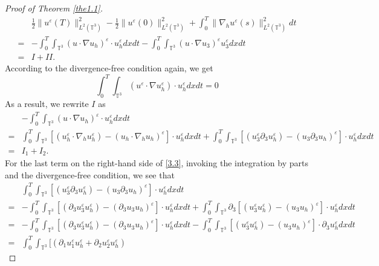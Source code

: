 \documentclass[11pt]{article}
\theoremstyle{plain}\newtheorem{definition}{Definition}[section]
\theoremstyle{definition}\newtheorem{theorem}{Theorem}[section]
\theoremstyle{plain}\newtheorem{lemma}[theorem]{Lemma}
\theoremstyle{plain}\newtheorem{coro}[theorem]{Corollary}
\theoremstyle{plain}\newtheorem{prop}[theorem]{Proposition}
\theoremstyle{remark}\newtheorem{remark}{Remark}[section]
\newcommand{\be}{\begin{equation}}
\newcommand{\ee}{\end{equation}}
\newcommand{\ba}{\begin{aligned}}
\newcommand{\ea}{\end{aligned}}
\newcommand{\f}{\frac}
\numberwithin{equation}{section}
\begin{document}
\begin{proof}[Proof of Theorem \ref{the1.1}]
\begin{equation}\ba\label{3.2}
&\f12\|u ^{\varepsilon}(T)\|^{2}_{L^{2}(\mathbb{T}^3)}
-\f12\|{u }^{\varepsilon}(0) \|^{2}_{L^{2}(\mathbb{T}^3)} +\int_{0}^{T}\|\nabla_{h}{u }^{\varepsilon}(s) \|^{2}_{L^{2}(\mathbb{T}^3)} dt \\=& - \int_{0}^{T}\int_{\mathbb{T}^{3}} (u\cdot \nabla u_{h})^{\varepsilon}\cdot u_{h}^{\varepsilon} dxdt - \int_{0}^{T}\int_{\mathbb{T}^{3}} (u\cdot \nabla u_{3})^{\varepsilon}u_{3}^{\varepsilon} dxdt\\
=&I+II.
\ea\end{equation}
According to the divergence-free condition again, we get
$$  \int_{0}^{T}\int_{\mathbb{T}^{3}} (u^{\varepsilon}\cdot \nabla u_{h}^{\varepsilon})\cdot u_{h}^{\varepsilon} dxdt =0$$
As a result, we rewrite $I$ as
\be\label{3.3}\ba
 &- \int_{0}^{T}\int_{\mathbb{T}^{3}} (u\cdot \nabla u_{h})^{\varepsilon}\cdot u_{h}^{\varepsilon} dxdt\\
= & \int_{0}^{T}\int_{\mathbb{T}^{3}} [(u_{h}^{\varepsilon}\cdot \nabla_{h} u_{h}^{\varepsilon})-(u_{h}\cdot \nabla_{h} u_{h})^{\varepsilon}]\cdot u_{h}^{\varepsilon} dxdt+\int_{0}^{T}\int_{\mathbb{T}^{3}} [(u_{3}^{\varepsilon}\partial_{3} u_{h}^{\varepsilon})-(u_{3}\partial_{3} u_{h})^{\varepsilon}]\cdot u_{h}^{\varepsilon} dxdt\\
=&I_1+I_2.
\ea\ee
For the last term on the right-hand side of \eqref{3.3}, invoking the integration by parts and the divergence-free condition, we see that
\begin{align}
&\int_{0}^{T}\int_{\mathbb{T}^{3}} [(u_{3}^{\varepsilon}\partial_{3} u_{h}^{\varepsilon})-(u_{3}\partial_{3} u_{h})^{\varepsilon}]\cdot u_{h}^{\varepsilon} dxdt\nonumber\\
=&-\int_{0}^{T}\int_{\mathbb{T}^{3}} [(\partial_{3}u_{3}^{\varepsilon} u_{h}^{\varepsilon})-(\partial_{3} u_{3} u_{h})^{\varepsilon}]\cdot u_{h}^{\varepsilon} dxdt
+\int_{0}^{T}\int_{\mathbb{T}^{3}} \partial_{3}[(u_{3}^{\varepsilon} u_{h}^{\varepsilon})-(  u_{3} u_{h})^{\varepsilon}]\cdot u_{h}^{\varepsilon} dxdt\nonumber\\
=&-\int_{0}^{T}\int_{\mathbb{T}^{3}} [(\partial_{3}u_{3}^{\varepsilon} u_{h}^{\varepsilon})-(\partial_{3} u_{3} u_{h})^{\varepsilon}]\cdot u_{h}^{\varepsilon} dxdt
-\int_{0}^{T}\int_{\mathbb{T}^{3}} [(u_{3}^{\varepsilon} u_{h}^{\varepsilon})-(  u_{3} u_{h})^{\varepsilon}]\cdot \partial_{3}u_{h}^{\varepsilon} dxdt\nonumber\\
=& \int_{0}^{T}\int_{\mathbb{T}^{3}} [(\partial_{1}u_{1}^{\varepsilon} u_{h}^{\varepsilon}+ \partial_{2}u_{2}^{\varepsilon}u_{h}^{\varepsilon})

\end{align}
\end{proof}
\end{document}
